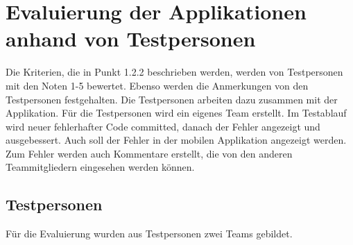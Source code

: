 \section{Evaluierung der Applikationen anhand von Testpersonen}
Die Kriterien, die in Punkt 1.2.2 beschrieben werden, werden von Testpersonen mit den Noten 1-5 bewertet. Ebenso werden die Anmerkungen von den Testpersonen festgehalten. Die Testpersonen arbeiten dazu zusammen mit der Applikation. Für die Testpersonen wird ein eigenes Team erstellt. Im Testablauf wird neuer fehlerhafter Code committed, danach der Fehler angezeigt und ausgebessert. Auch soll der Fehler in der mobilen Applikation angezeigt werden. Zum Fehler werden auch Kommentare erstellt, die von den anderen Teammitgliedern eingesehen werden können.
\subsection{Testpersonen}
Für die Evaluierung wurden aus Testpersonen zwei Teams gebildet.
